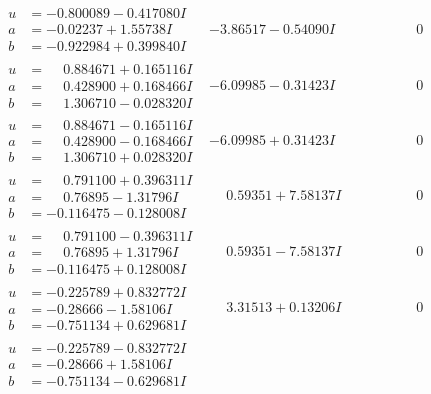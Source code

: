 \documentclass[1p]{elsarticle_modified}
\theoremstyle{definition}
\begin{document}
$$\begin{array}{c|c|c}
\begin{aligned}
u &= -0.800089 - 0.417080 I \\
a &= -0.02237 + 1.55738 I \\
b &= -0.922984 + 0.399840 I\end{aligned}
 & -3.86517 - 0.54090 I & \phantom{-0.000000 } 0 \\ \hline\begin{aligned}
u &= \phantom{-}0.884671 + 0.165116 I \\
a &= \phantom{-}0.428900 + 0.168466 I \\
b &= \phantom{-}1.306710 - 0.028320 I\end{aligned}
 & -6.09985 - 0.31423 I & \phantom{-0.000000 } 0 \\ \hline\begin{aligned}
u &= \phantom{-}0.884671 - 0.165116 I \\
a &= \phantom{-}0.428900 - 0.168466 I \\
b &= \phantom{-}1.306710 + 0.028320 I\end{aligned}
 & -6.09985 + 0.31423 I & \phantom{-0.000000 } 0 \\ \hline\begin{aligned}
u &= \phantom{-}0.791100 + 0.396311 I \\
a &= \phantom{-}0.76895 - 1.31796 I \\
b &= -0.116475 - 0.128008 I\end{aligned}
 & \phantom{-}0.59351 + 7.58137 I & \phantom{-0.000000 } 0 \\ \hline\begin{aligned}
u &= \phantom{-}0.791100 - 0.396311 I \\
a &= \phantom{-}0.76895 + 1.31796 I \\
b &= -0.116475 + 0.128008 I\end{aligned}
 & \phantom{-}0.59351 - 7.58137 I & \phantom{-0.000000 } 0 \\ \hline\begin{aligned}
u &= -0.225789 + 0.832772 I \\
a &= -0.28666 - 1.58106 I \\
b &= -0.751134 + 0.629681 I\end{aligned}
 & \phantom{-}3.31513 + 0.13206 I & \phantom{-0.000000 } 0 \\ \hline\begin{aligned}
u &= -0.225789 - 0.832772 I \\
a &= -0.28666 + 1.58106 I \\
b &= -0.751134 - 0.629681 I\end{aligned}

\end{array}$$
\end{document}
